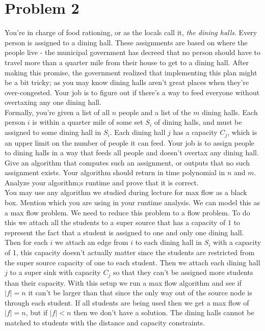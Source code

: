 \documentclass{article}
\begin{document}
\section*{Problem 2}
You're in charge of food rationing, or as the locals call it, \emph{the dining halls}.
Every person is assigned to a dining hall.
These assignments are based on where the people live - the municipal government has decreed that no person should have to travel more than a quarter mile from their house to get to a dining hall.
After making this promise, the government realized that implementing this plan might be a bit tricky; as you may know dining halls aren't great places when they're over-congested.
Your job is to figure out if there's a way to feed everyone without overtaxing any one dining hall.
\\
\indent Formally, you're given a list of all $n$ people and a list of the $m$ dining halls.
Each person $i$ is within a quarter mile of some set $S_i$ of dining halls, and must be assigned to some dining hall in $S_i$.
Each dining hall $j$ has a capacity $C_j$, which is an upper limit on the number of people it can feed.
Your job is to assign people to dining halls in a way that feeds all people and doesn't overtax any dining hall.
Give an algorithm that computes such an assignment, or outputs that no such assignment exists.
Your algorithm should return in time polynomial in $n$ and $m$. Analyze your algorithm;s runtime and prove that it is correct.
\\
\indent You may use any algorithm we studied during lecture for max flow as a black box.
Mention which you are using in your runtime analysis.
\newline
\newline
\indent We can model this as a max flow problem. We need to reduce this problem to a flow problem.
To do this we attach all the students to a super source that has a capacity of $1$ to represent the fact that a student is assigned to one and only one dining hall.
Then for each $i$ we attach an edge from $i$ to each dining hall in $S_i$ with a capacity of 1, this capacity doesn't actually matter since the students are restricted from the super source capacity of one to each student.
Then we attach each dining hall $j$ to a super sink with capacity $C_j$ so that they can't be assigned more students than their capacity.
With this setup we run a max flow algorithm and see if $|f| = n$ it can't be larger than that since the only way out of the source node is through each student.
If all students are being used then we get a max flow of $|f| = n$, but if $|f| < n$ then we don't have a solution.
The dining halls cannot be matched to students with the distance and capacity constraints.
\end{document}
